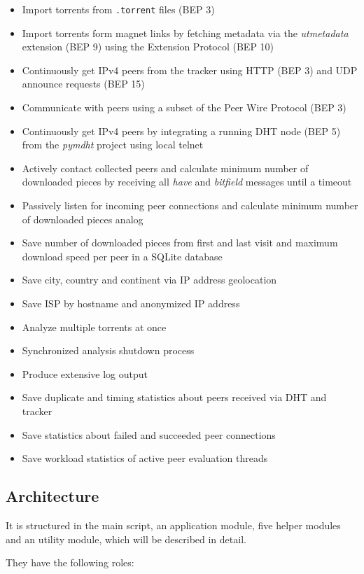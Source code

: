 \documentclass[10pt, a4paper]{scrartcl} %
\renewcommand{\_}{\origunderscore\allowbreak}
\begin{document}
\begin{itemize}
\item Import torrents from \texttt{.torrent} files (BEP 3)
\item Import torrents form magnet links by fetching metadata via the \emph{ut\_metadata} extension (BEP 9) using the Extension Protocol (BEP 10)
\item Continuously get IPv4 peers from the tracker using HTTP (BEP 3) and UDP announce requests (BEP 15)
\item Communicate with peers using a subset of the Peer Wire Protocol (BEP 3)
\item Continuously get IPv4 peers by integrating a running DHT node (BEP 5) from the \emph{pymdht} project using local telnet
\item Actively contact collected peers and calculate minimum number of downloaded pieces by receiving all \emph{have} and \emph{bitfield} messages until a timeout
\item Passively listen for incoming peer connections and calculate minimum number of downloaded pieces analog
\item Save number of downloaded pieces from first and last visit and maximum download speed per peer in a SQLite database
\item Save city, country and continent via IP address geolocation
\item Save ISP by hostname and anonymized IP address
\item Analyze multiple torrents at once
\item Synchronized analysis shutdown process
\item Produce extensive log output
\item Save duplicate and timing statistics about peers received via DHT and tracker
\item Save statistics about failed and succeeded peer connections
\item Save workload statistics of active peer evaluation threads
\end{itemize}

\subsection{Architecture}
It is structured in the main script, an application module, five helper modules and an utility module, which will be described in detail.

They have the following roles:
\end{document}
